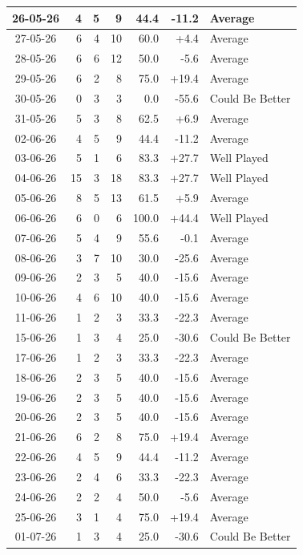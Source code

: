 \documentclass[journal]{IEEEtran}
\numberwithin{equation}{subsection}
\begin{document}
\begin{longtable}{|c|r|r|r|r|r|l|}
26-05-26 & 4 & 5 & 9 & 44.4 & -11.2 & Average\\ \hline
27-05-26 & 6 & 4 & 10 & 60.0 & +4.4 & Average\\ \hline
28-05-26 & 6 & 6 & 12 & 50.0 & -5.6 & Average\\ \hline
29-05-26 & 6 & 2 & 8 & 75.0 & +19.4 & Average\\ \hline
30-05-26 & 0 & 3 & 3 & 0.0 & -55.6 & Could Be Better\\ \hline
31-05-26 & 5 & 3 & 8 & 62.5 & +6.9 & Average\\ \hline
02-06-26 & 4 & 5 & 9 & 44.4 & -11.2 & Average\\ \hline
03-06-26 & 5 & 1 & 6 & 83.3 & +27.7 & Well Played\\ \hline
04-06-26 & 15 & 3 & 18 & 83.3 & +27.7 & Well Played\\ \hline
05-06-26 & 8 & 5 & 13 & 61.5 & +5.9 & Average\\ \hline
06-06-26 & 6 & 0 & 6 & 100.0 & +44.4 & Well Played\\ \hline
07-06-26 & 5 & 4 & 9 & 55.6 & -0.1 & Average\\ \hline
08-06-26 & 3 & 7 & 10 & 30.0 & -25.6 & Average\\ \hline
09-06-26 & 2 & 3 & 5 & 40.0 & -15.6 & Average\\ \hline
10-06-26 & 4 & 6 & 10 & 40.0 & -15.6 & Average\\ \hline
11-06-26 & 1 & 2 & 3 & 33.3 & -22.3 & Average\\ \hline
15-06-26 & 1 & 3 & 4 & 25.0 & -30.6 & Could Be Better\\ \hline
17-06-26 & 1 & 2 & 3 & 33.3 & -22.3 & Average\\ \hline
18-06-26 & 2 & 3 & 5 & 40.0 & -15.6 & Average\\ \hline
19-06-26 & 2 & 3 & 5 & 40.0 & -15.6 & Average\\ \hline
20-06-26 & 2 & 3 & 5 & 40.0 & -15.6 & Average\\ \hline
21-06-26 & 6 & 2 & 8 & 75.0 & +19.4 & Average\\ \hline
22-06-26 & 4 & 5 & 9 & 44.4 & -11.2 & Average\\ \hline
23-06-26 & 2 & 4 & 6 & 33.3 & -22.3 & Average\\ \hline
24-06-26 & 2 & 2 & 4 & 50.0 & -5.6 & Average\\ \hline
25-06-26 & 3 & 1 & 4 & 75.0 & +19.4 & Average\\ \hline
01-07-26 & 1 & 3 & 4 & 25.0 & -30.6 & Could Be Better\\ \hline

\end{longtable}
\end{document}
